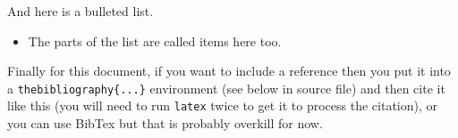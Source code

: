 \documentclass[a4wide, 11pt]{article}
\begin{document}
And here is a bulleted list.

\begin{itemize}

    \item
    The parts of the list are called items here too.
    
\end{itemize}

Finally for this document, if you want to include a reference
then you put it into a \texttt{thebibliography\{...\}}
environment (see below in source file) and then 
cite it like this \cite{lamport94}
(you will need to run \texttt{latex} twice to get it to process the citation),
or you can use BibTex but that is probably overkill for now.

\end{document}
